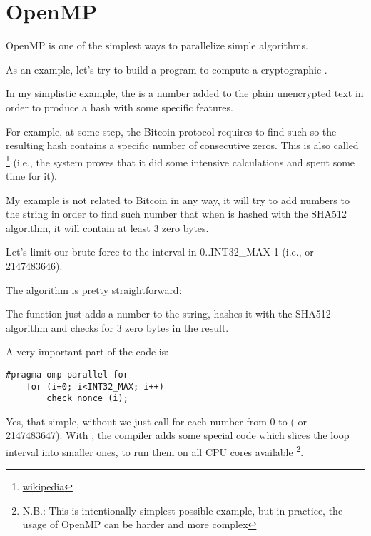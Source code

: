\section{OpenMP}
\label{openmp}

OpenMP is one of the simplest ways to parallelize simple algorithms.


As an example, let's try to build a program to compute a cryptographic .

In my simplistic example, 
the  is a number added to the plain unencrypted text in order to produce a hash with some specific 
features.

For example, at some step, the Bitcoin protocol requires to find such  so the resulting hash
contains a specific number of consecutive zeros.
This is also called 
\footnote{\href{http://go.yurichev.com/17101}{wikipedia}} 
(i.e., the system proves that it did some intensive calculations and spent some time for it).

My example is not related to Bitcoin in any way, 
it will try to add numbers to the 
string in order to find such number that when 
 is hashed with the SHA512 algorithm, it will contain at least 3 zero bytes.

Let's limit our brute-force to the interval in
0..INT32\_MAX-1 (i.e.,  or 2147483646).

The algorithm is pretty straightforward:



The  function just adds a number to the string, 
hashes it with the SHA512 algorithm and checks for 3 zero bytes in the result.

A very important part of the code is:

\begin{lstlisting}[style=customc]
	#pragma omp parallel for
	for (i=0; i<INT32_MAX; i++)
		check_nonce (i);
\end{lstlisting}

Yes, that simple, without  
we just call  for each number from 0 to 
 ( or 2147483647).
With , the compiler adds some special 
code which slices the loop interval into smaller ones,
to run them on all \ac{CPU} cores available
\footnote{N.B.: This is intentionally simplest possible
example, but in practice, the usage of OpenMP can be harder and more complex}.

